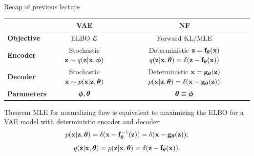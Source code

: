 \documentclass{beamer}
\begin{document}
\begin{frame}{Recap of previous lecture}
	\begin{table}[]
		\begin{tabular}{l|c|c}
			& \textbf{VAE} & \textbf{NF} \\ \hline
			\textbf{Objective} & ELBO $\mathcal{L}$ & Forward KL/MLE \\ \hline
			\textbf{Encoder} & \shortstack{Stochastic \\ $\mathbf{z} \sim q (\mathbf{z} | \mathbf{x}, \boldsymbol{\phi})$} &  \shortstack{\\ Deterministic \\ $\mathbf{z} = \mathbf{f}_{\boldsymbol{\theta}}(\mathbf{x})$ \\ $q(\mathbf{z} | \mathbf{x}, \boldsymbol{\theta}) = \delta(\mathbf{z} - \mathbf{f}_{\boldsymbol{\theta}}(\mathbf{x}))$}  \\ \hline
			\textbf{Decoder} & \shortstack{Stochastic \\ $\mathbf{x} \sim p (\mathbf{x} | \mathbf{z}, \boldsymbol{\theta})$} & \shortstack{\\ Deterministic \\ $\mathbf{x} = \mathbf{g}_{\boldsymbol{\theta}}(\mathbf{z})$ \\ $ p(\mathbf{x} | \mathbf{z}, \boldsymbol{\theta}) = \delta(\mathbf{x} - \mathbf{g}_{\boldsymbol{\theta}}(\mathbf{z}))$} \\ \hline
			\textbf{Parameters}  & $\boldsymbol{\phi}, \boldsymbol{\theta}$ & $\boldsymbol{\theta} \equiv \boldsymbol{\phi}$\\ 
		\end{tabular}
	\end{table}
	\begin{block}{Theorem}
		MLE for normalizing flow is equivalent to maximizing the ELBO for a VAE model with deterministic encoder and decoder:
		\vspace{-0.3cm}
		\[
		p(\mathbf{x} | \mathbf{z}, \boldsymbol{\theta}) = \delta (\mathbf{x} - \mathbf{f}^{-1}_{\boldsymbol{\theta}}(\mathbf{z})) = \delta (\mathbf{x} - \mathbf{g}_{\boldsymbol{\theta}}(\mathbf{z}));
		\]
		\[
		q(\mathbf{z} | \mathbf{x}, \boldsymbol{\theta}) = p(\mathbf{z} | \mathbf{x}, \boldsymbol{\theta}) = \delta (\mathbf{z} - \mathbf{f}_{\boldsymbol{\theta}}(\mathbf{x})).
		\]
	\end{block}
\end{frame}
\end{document}
